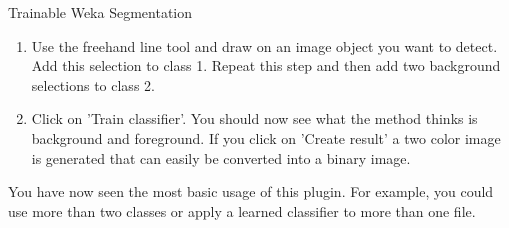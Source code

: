 \begin{taskbox}{Trainable Weka Segmentation}
\begin{enumerate}
	\item Use the freehand line tool and draw on an image object you want to detect. Add this selection to class 1. Repeat this step and then add two background selections to class 2. 
	\item Click on 'Train classifier'. You should now see what the method thinks is background and foreground. If you click on 'Create result' a two color image is generated that can easily be converted into a binary image.
	
\end{enumerate}

You have now seen the most basic usage of this plugin. For example, you could use more than two classes or apply a learned classifier to more than one file.
\end{taskbox}
